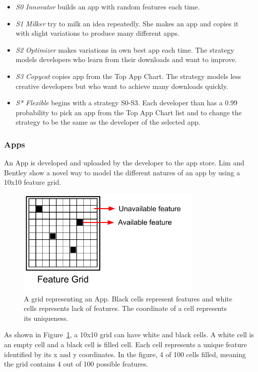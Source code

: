 \begin{itemize}
  \item \emph{S0 Innovator} builds an app with random features each time.
  \item \emph{S1 Milker} try to milk an idea repeatedly. She makes an app and copies it with slight variations to produce many different apps.
  \item \emph{S2 Optimizer} makes variations in own best app each time. The strategy models developers who learn from their downloads and want to improve.
  \item \emph{S3 Copycat} copies app from the Top App Chart. The strategy models less creative developers but who want to achieve many downloads quickly.
  \item \emph{S* Flexible} begins with a strategy S0-S3. Each developer than has a 0.99 probability to pick an app from the Top App Chart list and to change the strategy to be the same as the developer of the selected app.
\end{itemize}

\subsubsection*{Apps}
\label{subsubsec:apps}

An App is developed and uploaded by the developer to the app store. Lim and Bentley show a novel way to model the different natures of an app by using a 10x10 feature grid.

\begin{figure}[!htb]
  \centering
  \includegraphics[width=9cm]{figures/example_service_grid.pdf}
  \caption{A grid representing an App. Black cells represent features and white cells represents lack of features. The coordinate of a cell represents its uniqueness.}
  \label{fig:example-grid}
\end{figure}

As shown in Figure~\ref{fig:example-grid}, a 10x10 grid can have white and black cells. A white cell is an empty cell and a black cell is filled cell. Each cell represents a unique feature identified by its x and y coordinates. In the figure, 4 of 100 cells filled, meaning the grid contains 4 out of 100 possible features. 

